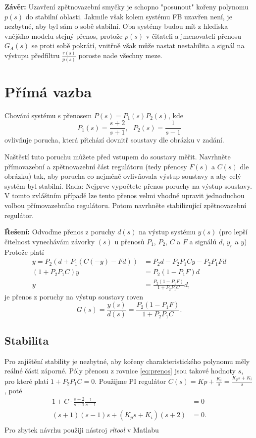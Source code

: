 \documentclass[twoside]{article}
\begin{document}
\textbf{Závěr:} Uzavření zpětnovazební smyčky je schopno "posunout" kořeny polynomu $p(s)$
do stabilní oblasti. Jakmile však kolem systému FB uzavřen není, je nezbytné, aby byl sám o sobě stabilní.
Oba systémy budou mít z hlediska vnějšího modelu stejný přenos, protože $p(s)$ v čitateli a jmenovateli přenosu $G_A(s)$
se proti sobě pokrátí, vnitřně však může nastat nestabilita a signál na výstupu předfiltru $\frac{r(s)}{p(s)}$ poroste nade všechny meze.

\section{Přímá vazba}
Chování systému s přenosem $P(s) = P_1(s) P_2(s)$, kde
\begin{equation}
	P_1(s) = \frac{s+2}{s+1}, ~~~ P_2(s) = \frac{1}{s-1}
\end{equation}
ovlivňuje porucha, která přichází dovnitř soustavy dle obrázku v zadání.

Naštěstí tuto poruchu můžete před vstupem do soustavy měřit. Navrhněte přímovazební a
zpětnovazební část regulátoru (tedy přenosy $F(s)$ a $C(s)$ dle obrázku) tak, aby porucha co nejméně
ovlivňovala výstup soustavy a aby celý systém byl stabilní.
Rada: Nejprve vypočtete přenos poruchy na výstup soustavy. V tomto zvláštním případě lze tento přenos
velmi vhodně upravit jednoduchou volbou přímovazebního regulátoru. Potom navrhněte stabilizující
zpětnovazební regulátor. 

\textbf{Řešení:}
Odvoďme přenos z poruchy $d(s)$ na výstup systému $y(s)$ (pro lepší čitelnost vynechávám závorky $(s)$ u přenosů $P_1$, $P_2$, $C$ a $F$
a signálů $d$, $y_r$ a $y$) Protože platí
\begin{equation}
	\begin{split}
		y = P_2 (d + P_1(C (-y) - F d)) &= P_2 d - P_2 P_1 C y - P_2 P_1 F d\\
		(1 + P_2 P_1 C)y &= P_2(1-P_1 F) d \\
		y &= \frac{P_2(1-P_1 F)}{1 + P_2 P_1 C} d,
	\end{split}
\end{equation}
je přenos z poruchy na výstup soustavy roven
\begin{equation}
	G(s) = \frac{y(s)}{d(s)} = \frac{P_2(1-P_1 F)}{1 + P_2 P_1 C}.
	\label{eq:prenos}
\end{equation}
\subsection{Stabilita}
Pro zajištění stability je nezbytné, aby kořeny charakteristického polynomu měly
reálné části záporné. Póly přenosu z rovnice \eqref{eq:prenos} jsou takové hodnoty $s$, pro které platí $1 + P_2 P_1 C = 0$. 
Použijme PI regulátor $C(s) = Kp + \frac{K_i}{s} = \frac{K_p s + K_i}{s}$, poté
\begin{equation}
	\begin{split}
		1 + C \cdot \frac{s+2}{s+1} \frac{1}{s-1} &= 0 \\
		(s+1)(s-1)s + (K_p s + K_i) (s+2) &= 0. \\
	\end{split}
\end{equation}
Pro zbytek návrhu použiji nástroj \textit{rltool} v Matlabu
\end{document}
